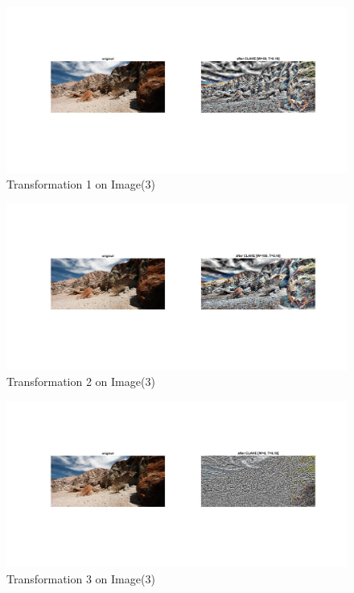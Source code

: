 \documentclass[12pt, a4paper]{article}
\begin{document}
\renewcommand{\thefigure}{5.31}
\begin{figure}[H]
    \centering
    \vspace*{-30pt}
    \includegraphics[width=\textwidth]{e31.jpg}
    \vspace*{-90pt}
    \caption{Transformation 1 on Image(3)}
    \label{fig:5.31}
\end{figure}
\newpage
\renewcommand{\thefigure}{5.32}
\begin{figure}[H]
    \centering
    \includegraphics[width=\textwidth]{e32.jpg}
    \vspace*{-90pt}
    \caption{Transformation 2 on Image(3)}
    \label{fig:5.32}
\end{figure}
\renewcommand{\thefigure}{5.33}
\begin{figure}[H]
    \centering
    \vspace*{-30pt}
    \includegraphics[width=\textwidth]{e33.jpg}
    \vspace*{-90pt}
    \caption{Transformation 3 on Image(3)}
    \label{fig:5.33}
\end{figure}
\end{document}
